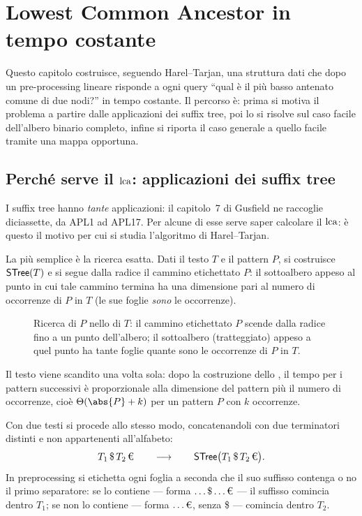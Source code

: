 \chapter{Lowest Common Ancestor in tempo costante}


Questo capitolo costruisce, seguendo Harel--Tarjan, una struttura dati che dopo un
pre-processing lineare risponde a ogni query ``qual è il più basso antenato comune di
due nodi?'' in tempo costante. Il percorso è: prima si motiva il problema a
partire dalle applicazioni dei suffix tree, poi lo si risolve sul caso facile
dell'albero binario completo, infine si riporta il caso generale a quello facile
tramite una mappa opportuna.

\section{Perché serve il \texorpdfstring{$\operatorname{lca}$}{lca}: applicazioni dei suffix tree}

I suffix tree hanno \emph{tante} applicazioni: il capitolo~7 di Gusfield ne raccoglie
diciassette, da APL1 ad APL17. Per alcune di esse serve saper calcolare il $\operatorname{lca}$: è
questo il motivo per cui si studia l'algoritmo di Harel--Tarjan.

La più semplice è la ricerca esatta. Dati il testo $T$ e il pattern $P$, si costruisce
$\textsf{STree}(T)$ e si segue dalla radice il cammino etichettato $P$: il sottoalbero appeso
al punto in cui tale cammino termina ha una dimensione pari al numero di occorrenze di
$P$ in $T$ (le sue foglie \emph{sono} le occorrenze).

\begin{figure}[H]
  \centering
  
  \caption{Ricerca di $P$ nello \STree di $T$: il cammino etichettato $P$ scende dalla
    radice fino a un punto dell'albero; il sottoalbero (tratteggiato) appeso a quel
    punto ha tante foglie quante sono le occorrenze di $P$ in $T$.}
  \label{fig:stree-occorrenze}
\end{figure}

\begin{osservazione}
  Il testo viene scandito una volta sola: dopo la costruzione dello \STree, il tempo
  per i pattern successivi è proporzionale alla dimensione del pattern più il numero di
  occorrenze, cioè $\Th(\abs{P}+k)$ per un pattern $P$ con $k$ occorrenze.
\end{osservazione}

Con due testi si procede allo stesso modo, concatenandoli con due terminatori distinti
e non appartenenti all'alfabeto:
\[
  T_1\,\text{\$}\,T_2\,\text{\texteuro}
  \qquad\longrightarrow\qquad
  \STree\bigl(T_1\,\text{\$}\,T_2\,\text{\texteuro}\bigr).
\]
In preprocessing si etichetta ogni foglia a seconda che il suo suffisso contenga o no
il primo separatore: se lo contiene --- forma $\dots\text{\$}\dots\text{\texteuro}$ ---
il suffisso comincia dentro $T_1$; se non lo contiene --- forma
$\dots\text{\texteuro}$, senza \$ --- comincia dentro $T_2$.

